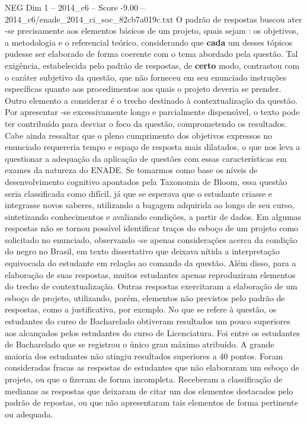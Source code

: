 \begin{textsample}{NEG Dim 1 – 2014\_c6 – Score -9.00 – 2014\_c6/enade\_2014\_ci\_soc\_82cb7a019c.txt}
O padrão de respostas buscou ater -se precisamente aos elementos básicos de um projeto, quais sejam : os objetivos, a metodologia e o referencial teórico, considerando que \textbf{cada} um desses tópicos pudesse ser elaborado de forma coerente com o tema abordado pela questão.
Tal exigência, estabelecida pelo padrão de respostas, de \textbf{certo} modo, contrastou com o caráter subjetivo da questão, que não forneceu em seu enunciado instruções específicas quanto aos procedimentos aos quais o projeto deveria se prender.
Outro elemento a considerar é o trecho destinado à contextualização da questão.
Por apresentar -se excessivamente longo e parcialmente dispensável, o texto pode ter contribuído para desviar o foco da questão, comprometendo os resultados.
Cabe ainda ressaltar que o pleno cumprimento dos objetivos expressos no enunciado requereria tempo e espaço de resposta mais dilatados, o que nos leva a questionar a adequação da aplicação de questões com essas características em exames da natureza do ENADE.
Se tomarmos como base os níveis de desenvolvimento cognitivo apontados pela Taxonomia de Bloom, essa questão seria classificada como difícil, já que se esperava que o estudante criasse e integrasse novos saberes, utilizando a bagagem adquirida ao longo de seu curso, sintetizando conhecimentos e avaliando condições, a partir de dados.
Em algumas respostas não se tornou possível identificar traços do esboço de um projeto como solicitado no enunciado, observando -se apenas considerações acerca da condição do negro no Brasil, em texto dissertativo que deixava nítida a interpretação equivocada do estudante em relação ao comando da questão.
Além disso, para a elaboração de suas respostas, muitos estudantes apenas reproduziram elementos do trecho de contextualização.
Outras respostas exercitaram a elaboração de um esboço de projeto, utilizando, porém, elementos não previstos pelo padrão de respostas, como a justificativa, por exemplo.
No que se refere à questão, os estudantes do curso de Bacharelado obtiveram resultados um pouco superiores aos alcançados pelos estudantes do curso de Licenciatura.
Foi entre os estudantes de Bacharelado que se registrou o único grau máximo atribuído.
A grande maioria dos estudantes não atingiu resultados superiores a 40 pontos.
Foram consideradas fracas as respostas de estudantes que não elaboraram um esboço de projeto, ou que o fizeram de forma incompleta.
Receberam a classificação de medianas as respostas que deixaram de citar um dos elementos destacados pelo padrão de repostas, ou que não apresentaram tais elementos de forma pertinente ou adequada.

\end{textsample}
